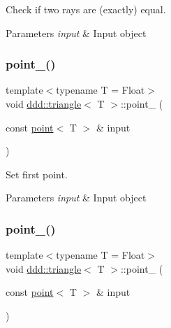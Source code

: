 Check if two rays are (exactly) equal. 


\begin{DoxyParams}{Parameters}
{\em input} & Input object \\
\hline
\end{DoxyParams}
\mbox{\label{classddd_1_1triangle_af8c30b97314cd78877330b80e2139612}} 
\subsubsection{\texorpdfstring{point\+\_()}{point\_1()}}
{\footnotesize\ttfamily template$<$typename T = Float$>$ \\
void \hyperlink{classddd_1_1triangle}{ddd\+::triangle}$<$ T $>$\+::point\+\_ (\begin{DoxyParamCaption}\item[{const \hyperlink{classddd_1_1point}{point}$<$ T $>$ \&}]{input }\end{DoxyParamCaption})\hspace{0.3cm}{\ttfamily [inline]}}



Set first point. 


\begin{DoxyParams}{Parameters}
{\em input} & Input object \\
\hline
\end{DoxyParams}
\mbox{\label{classddd_1_1triangle_a700e0229138322947ad2c0e4c57c285d}} 
\subsubsection{\texorpdfstring{point\+\_()}{point\_2()}}
{\footnotesize\ttfamily template$<$typename T = Float$>$ \\
void \hyperlink{classddd_1_1triangle}{ddd\+::triangle}$<$ T $>$\+::point\+\_ (\begin{DoxyParamCaption}\item[{const \hyperlink{classddd_1_1point}{point}$<$ T $>$ \&}]{input }\end{DoxyParamCaption})\hspace{0.3cm}{\ttfamily [inline]}}



